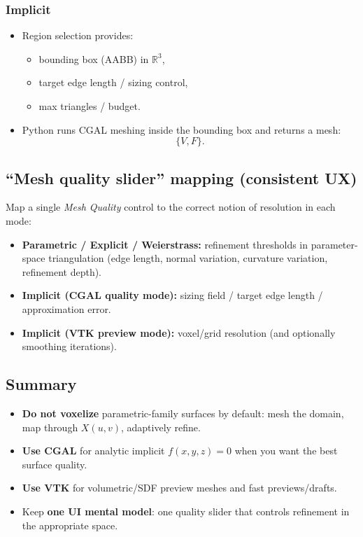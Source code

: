 \documentclass[12pt,a4paper]{article}
\newcommand{\R}{\mathbb{R}}
\theoremstyle{plain}
\theoremstyle{definition}
\begin{document}
		\subsubsection*{Implicit}
	\begin{itemize}
		\item Region selection provides:
		\begin{itemize}
			\item bounding box (AABB) in $\R^3$,
			\item target edge length / sizing control,
			\item max triangles / budget.
		\end{itemize}
		\item Python runs CGAL meshing inside the bounding box and returns a mesh:
		\[
		\{V,F\}.
		\]
	\end{itemize}
	
	\subsection{``Mesh quality slider'' mapping (consistent UX)}
	Map a single \emph{Mesh Quality} control to the correct notion of resolution in each mode:
	\begin{itemize}
		\item \textbf{Parametric / Explicit / Weierstrass:} refinement thresholds in parameter-space triangulation
		(edge length, normal variation, curvature variation, refinement depth).
		\item \textbf{Implicit (CGAL quality mode):} sizing field / target edge length / approximation error.
		\item \textbf{Implicit (VTK preview mode):} voxel/grid resolution (and optionally smoothing iterations).
	\end{itemize}
	
	\subsection{Summary}
	\begin{itemize}
		\item \textbf{Do not voxelize} parametric-family surfaces by default: mesh the domain, map through $X(u,v)$, adaptively refine.
		\item \textbf{Use CGAL} for analytic implicit $f(x,y,z)=0$ when you want the best surface quality.
		\item \textbf{Use VTK} for volumetric/SDF preview meshes and fast previews/drafts.
		\item Keep \textbf{one UI mental model}: one quality slider that controls refinement in the appropriate space.
	\end{itemize}
	
\end{document}
